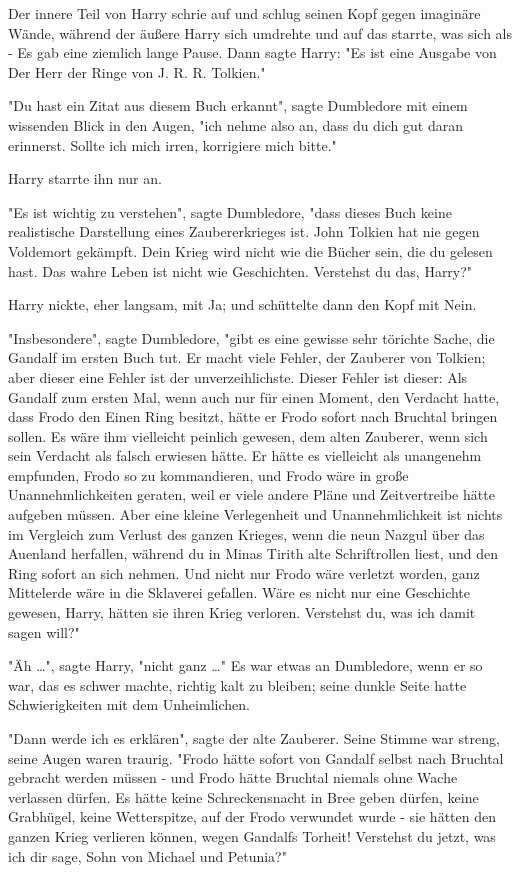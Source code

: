 {Der innere Teil von Harry schrie auf und schlug seinen Kopf gegen imaginäre Wände, während der äußere Harry sich umdrehte und auf das starrte, was sich als - Es gab eine ziemlich lange Pause. Dann sagte Harry: "Es ist eine Ausgabe von Der Herr der Ringe von J. R. R. Tolkien."

"Du hast ein Zitat aus diesem Buch erkannt", sagte Dumbledore mit einem wissenden Blick in den Augen, "ich nehme also an, dass du dich gut daran erinnerst. Sollte ich mich irren, korrigiere mich bitte."

Harry starrte ihn nur an.

"Es ist wichtig zu verstehen", sagte Dumbledore, "dass dieses Buch keine realistische Darstellung eines Zaubererkrieges ist. John Tolkien hat nie gegen Voldemort gekämpft. Dein Krieg wird nicht wie die Bücher sein, die du gelesen hast. Das wahre Leben ist nicht wie Geschichten. Verstehst du das, Harry?"

Harry nickte, eher langsam, mit Ja; und schüttelte dann den Kopf mit Nein.

"Insbesondere", sagte Dumbledore, "gibt es eine gewisse sehr törichte Sache, die Gandalf im ersten Buch tut. Er macht viele Fehler, der Zauberer von Tolkien; aber dieser eine Fehler ist der unverzeihlichste. Dieser Fehler ist dieser: Als Gandalf zum ersten Mal, wenn auch nur für einen Moment, den Verdacht hatte, dass Frodo den Einen Ring besitzt, hätte er Frodo sofort nach Bruchtal bringen sollen. Es wäre ihm vielleicht peinlich gewesen, dem alten Zauberer, wenn sich sein Verdacht als falsch erwiesen hätte. Er hätte es vielleicht als unangenehm empfunden, Frodo so zu kommandieren, und Frodo wäre in große Unannehmlichkeiten geraten, weil er viele andere Pläne und Zeitvertreibe hätte aufgeben müssen. Aber eine kleine Verlegenheit und Unannehmlichkeit ist nichts im Vergleich zum Verlust des ganzen Krieges, wenn die neun Nazgul über das Auenland herfallen, während du in Minas Tirith alte Schriftrollen liest, und den Ring sofort an sich nehmen. Und nicht nur Frodo wäre verletzt worden, ganz Mittelerde wäre in die Sklaverei gefallen. Wäre es nicht nur eine Geschichte gewesen, Harry, hätten sie ihren Krieg verloren. Verstehst du, was ich damit sagen will?"

"Äh …", sagte Harry, "nicht ganz …" Es war etwas an Dumbledore, wenn er so war, das es schwer machte, richtig kalt zu bleiben; seine dunkle Seite hatte Schwierigkeiten mit dem Unheimlichen.

"Dann werde ich es erklären", sagte der alte Zauberer. Seine Stimme war streng, seine Augen waren traurig. "Frodo hätte sofort von Gandalf selbst nach Bruchtal gebracht werden müssen - und Frodo hätte Bruchtal niemals ohne Wache verlassen dürfen. Es hätte keine Schreckensnacht in Bree geben dürfen, keine Grabhügel, keine Wetterspitze, auf der Frodo verwundet wurde - sie hätten den ganzen Krieg verlieren können, wegen Gandalfs Torheit! Verstehst du jetzt, was ich dir sage, Sohn von Michael und Petunia?"

}
